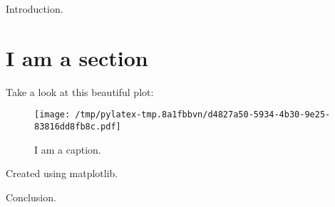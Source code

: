 \documentclass{article}%
\begin{document}
%
\normalsize%
Introduction.%
\section{I am a section}%
\label{sec:Iamasection}%
Take a look at this beautiful plot:%


\begin{figure}[htbp]%
\centering%
\texttt{[image: /tmp/pylatex-tmp.8a1fbbvn/d4827a50-5934-4b30-9e25-83816dd8fb8c.pdf]}%
\caption{I am a caption.}%
\end{figure}

%
Created using matplotlib.

%
Conclusion.%
\end{document}
